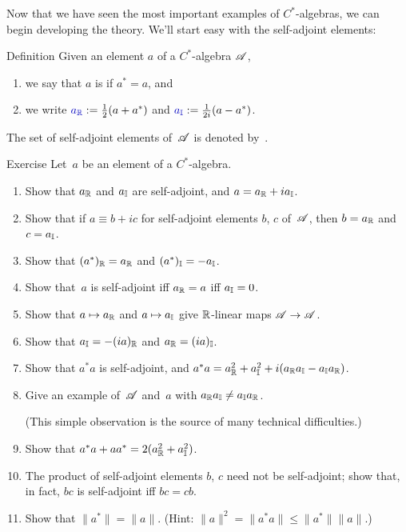 \documentclass[a]{subfiles}
\begin{document}
\begin{parsec}%
\begin{point}%
Now that we have seen the most important examples
of $C^*$-algebras,
we can begin developing the theory.
We'll start easy with the self-adjoint elements:
\end{point}
\begin{point}{Definition}%
Given an element $a$ of a $C^*$-algebra $\mathscr{A}$, 
\begin{enumerate}
\item we say that $a$ is  if $a^* =a$, and
\item we write $\Define{\Real{a}}:= \frac{1}{2}(a+a^*)$
and $\Define{\Imag{a}}:=\frac{1}{2i}(a-a^*)$.
\end{enumerate}
The set of self-adjoint elements of~$\mathscr{A}$
is denoted by~\Define{$\sa{\scrA}$}.
\end{point}
\begin{point}{Exercise}%
Let~$a$ be an element of a $C^*$-algebra.
\begin{enumerate}
\item 
Show that $a_{\mathbb{R}}$ and $a_{\mathbb{I}}$ are self-adjoint,
and  $a= a_{\mathbb{R}}+ia_{\mathbb{I}}$.
\item
Show that if $a\equiv b+ic$ for self-adjoint elements $b$, $c$ of~$\mathscr{A}$,
then $b=a_{\mathbb{R}}$ and~$c=a_{\mathbb{I}}$.
\item
Show that $(a^*)_{\mathbb{R}}=a_{\mathbb{R}}$ and $(a^*)_{\mathbb{I}}=-a_{\mathbb{I}}$.
\item 
Show that~$a$ is self-adjoint iff $a_{\mathbb{R}}=a$ iff $a_{\mathbb{I}}=0$.
\item
Show that $a\mapsto a_{\mathbb{R}}$ and $a\mapsto a_{\mathbb{I}}$
give $\mathbb{R}$-linear maps $\mathscr{A}\to\mathscr{A}$.
\item
Show that $a_{\mathbb{I}} = -(ia)_{\mathbb{R}}$ and $a_{\mathbb{R}}=(ia)_{\mathbb{I}}$.
\item
Show that $a^*a$ is self-adjoint,
and  $a^*a=a_{\mathbb{R}}^2+a_{\mathbb{I}}^2+i(a_{\mathbb{R}}a_{\mathbb{I}}-a_{\mathbb{I}}a_{\mathbb{R}})$.
\item
Give an example of~$\mathscr{A}$ and~$a$ 
with  $a_{\mathbb{R}}a_{\mathbb{I}} \neq a_{\mathbb{I}}a_{\mathbb{R}}$.

(This simple observation is the source of many technical difficulties.)
\item
Show that $a^*a+aa^* = 2(a_{\mathbb{R}}^2+a_{\mathbb{I}}^2)$.
\item
The product of self-adjoint elements $b$, $c$ need not be self-adjoint;
show that, in fact, $bc$ is self-adjoint iff $bc=cb$.
\item
Show that $\|a^*\| = \|a\|$. (Hint:  $\|a\|^2=\|a^*a\|\leq \|a^*\|\|a\|$.)
\end{enumerate}
\end{point}
\end{parsec}
\end{document}
